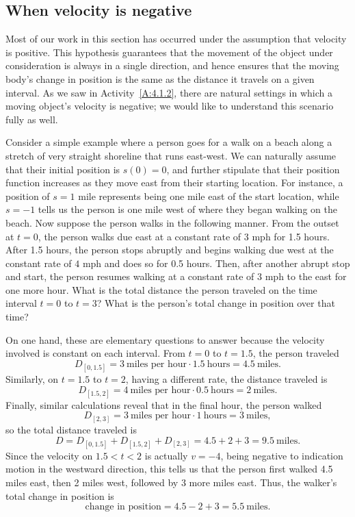 

\subsection*{When velocity is negative}

Most of our work in this section has occurred under the assumption that velocity is positive.  This hypothesis guarantees that the movement of the object under consideration is always in a single direction, and hence ensures that the moving body's change in position is the same as the distance it travels on a given interval.  As we saw in Activity~\ref{A:4.1.2}, there are natural settings in which a moving object's velocity is negative; we would like to understand this scenario fully as well.

Consider a simple example where a person goes for a walk on a beach along a stretch of very straight shoreline that runs east-west.  We can naturally assume that their initial position is $s(0) = 0$, and further stipulate that their position function increases as they move east from their starting location.  For instance, a position of $s = 1$ mile represents being one mile east of the start location, while $s = -1$ tells us the person is one mile west of where they began walking on the beach.  Now suppose the person walks in the following manner.  From the outset at $t = 0$, the person walks due east at a constant rate of $3$ mph for 1.5 hours.  After 1.5 hours, the person stops abruptly and begins walking due west at the constant rate of $4$ mph and does so for 0.5 hours.  Then, after another abrupt stop and start, the person resumes walking at a constant rate of $3$ mph to the east for one more hour.  What is the total distance the person traveled on the time interval $t = 0$ to $t = 3$?  What is the person's total change in position over that time?

On one hand, these are elementary questions to answer because the velocity involved is constant on each interval.  From $t = 0$ to $t = 1.5$, the person traveled $$D_{[0,1.5]} = 3 \ \mbox{miles per hour} \cdot 1.5 \ \mbox{hours} = 4.5 \ \mbox{miles}.$$  Similarly, on $t = 1.5$ to $t = 2$, having a different rate, the distance traveled is
$$D_{[1.5,2]} = 4 \ \mbox{miles per hour} \cdot 0.5 \ \mbox{hours} = 2 \ \mbox{miles}.$$
Finally, similar calculations reveal that in the final hour, the person walked
$$D_{[2,3]} = 3 \ \mbox{miles per hour} \cdot 1 \ \mbox{hours} = 3 \ \mbox{miles},$$
so the total distance traveled is
$$D = D_{[0,1.5]} + D_{[1.5,2]} + D_{[2,3]} = 4.5 + 2 + 3 = 9.5 \ \mbox{miles}.$$
Since the velocity on $1.5 < t < 2$ is actually $v = -4$, being negative to indication motion in the westward direction, this tells us that the person first walked 4.5 miles east, then 2 miles west, followed by 3 more miles east.  Thus, the walker's total change in position is
$$\mbox{change in position} = 4.5 - 2 + 3 = 5.5 \ \mbox{miles}.$$

